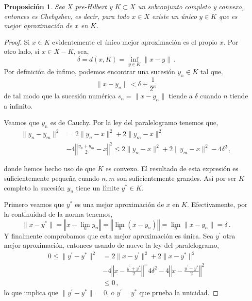 \documentclass[12pt]{book}
\newtheorem{prop}{\bf Proposición}[chapter]
\newcommand{\norm}[1]{\lVert #1\rVert }
\newcommand{\Norm}[1]{\left\Vert #1\right\Vert }
\begin{document}
  \begin{prop} Sea $X$ pre-Hilbert y $K\subset X$ un subconjunto completo  y convexo, entonces es Chebyshev, es decir, para todo $x\in X$ existe un único $y\in K$ que es mejor aproximación de $x$ en $K$.
  \end{prop}
  \begin{proof}
Si $x\in K$ evidentemente el único mejor aproximación es el propio $x$. Por otro lado, si $x\in X-K$, sea,
$$\delta=d(x,K)=\inf_{y\in K} \norm{x- y}\,.$$
Por definición de ínfimo, podemos encontrar una sucesión $y_n\in K$ tal que,
$$\norm{x-y_n}<\delta +\frac{1}{2^n}$$
de tal modo que la sucesión numérica $s_n=\norm{x-y_n}$ tiende a $\delta$ cuando $n$ tiende a infinito.

Veamos  que $y_n$ es de Cauchy. Por la ley del paralelogramo tenemos que,
\begin{align*}
\norm{y_n-y_m}^2 &=2\norm{y_n-x}^2+2\norm{y_m- x}^2\\
& - 4\Norm{\frac{y_n+y_m}{2} -x}^2 \leq 2\norm{ y_n-x}^2+2\norm{y_m-x}^2 -4\delta^2\,,
\end{align*}

donde hemos hecho uso de que $K$ es convexo.  El resultado de  esta expresión es suficientemente pequeña  cuando $n,m$ son suficientemente grandes.  Así por ser $K$ completo  la sucesión $y_n$ tiene un límite $y^*\in K$.

Primero veamos que $y^*$  es una mejor aproximación de $x$ en $K$. Efectivamente, por la continuidad de la norma tenemos,
$$\norm{x-y^*}=\Norm{x-\lim_n  y_n}=\Norm{\lim_n\left(x-y_n\right)}=\lim_n\norm{x-y_n}=\delta\,.$$
Y finalmente comprobamos que esta mejor aproximación es única. Sea $y^\prime$ otra mejor aproximación, entonces usando de nuevo la ley del paralelogramo,
\begin{align*}
0\leq\norm{y^\prime-y^*}^2&=2\norm{x-y^\prime}^2+ 2\norm{x-y^*}^2\\
& - 4\Norm{x-\frac{y^\prime+y^*}{2}}^=4\delta^2-4\Norm{x-\frac{y^\prime-y^*}{2}}^2 \\
&\leq0\,,
\end{align*}
lo que implica que $\norm{y^\prime-y^*}=0$, o $y^\prime=y^*$  que prueba la unicidad.
\end{proof}
\end{document}
